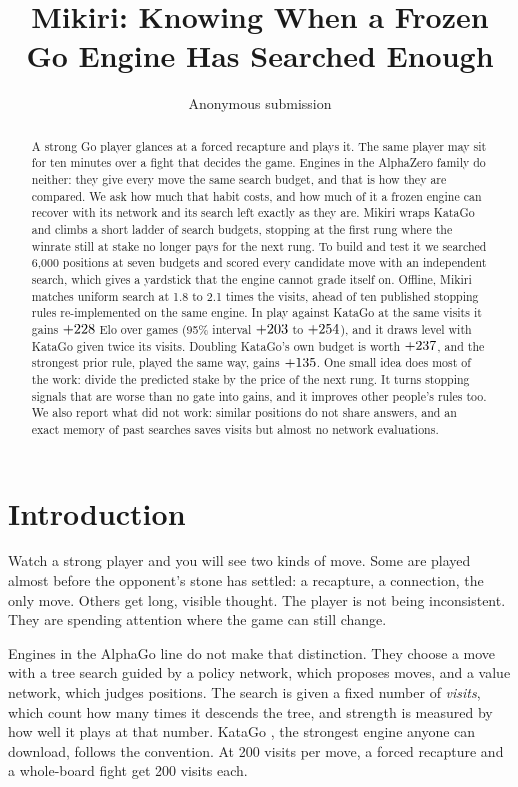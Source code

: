 \documentclass{article}
\title{Mikiri: Knowing When a Frozen Go Engine Has Searched Enough}
\author{
    Anonymous submission
}
\begin{document}
\maketitle

\begin{abstract}
A strong Go player glances at a forced recapture and plays it. The same player may sit for ten minutes over a fight that decides the game. Engines in the AlphaZero family do neither: they give every move the same search budget, and that is how they are compared. We ask how much that habit costs, and how much of it a frozen engine can recover with its network and its search left exactly as they are. Mikiri wraps KataGo and climbs a short ladder of search budgets, stopping at the first rung where the winrate still at stake no longer pays for the next rung. To build and test it we searched 6{,}000 positions at seven budgets and scored every candidate move with an independent search, which gives a yardstick that the engine cannot grade itself on. Offline, Mikiri matches uniform search at 1.8 to 2.1 times the visits, ahead of ten published stopping rules re-implemented on the same engine. In play against KataGo at the same visits it gains $+228$ Elo over \longGames{} games (95\% interval $+203$ to $+254$), and it draws level with KataGo given twice its visits. Doubling KataGo's own budget is worth $+237$, and the strongest prior rule, played the same way, gains $+135$. One small idea does most of the work: divide the predicted stake by the price of the next rung. It turns stopping signals that are worse than no gate into gains, and it improves other people's rules too. We also report what did not work: similar positions do not share answers, and an exact memory of past searches saves visits but almost no network evaluations.
\end{abstract}

\section{Introduction}

Watch a strong player and you will see two kinds of move. Some are played almost before the opponent's stone has settled: a recapture, a connection, the only move. Others get long, visible thought. The player is not being inconsistent. They are spending attention where the game can still change.

Engines in the AlphaGo line \cite{silver2016mastering,silver2017mastering} do not make that distinction. They choose a move with a tree search guided by a policy network, which proposes moves, and a value network, which judges positions. The search is given a fixed number of \emph{visits}, which count how many times it descends the tree, and strength is measured by how well it plays at that number. KataGo \cite{wu2019accelerating}, the strongest engine anyone can download, follows the convention. At 200 visits per move, a forced recapture and a whole-board fight get 200 visits each.
\end{document}
